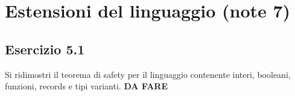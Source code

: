 \section{Estensioni del linguaggio (note 7)}
\subsection*{Esercizio 5.1}
Si ridimostri il teorema di safety per il linguaggio contenente interi, booleani, funzioni, records e tipi varianti. 
\textbf{{\color{red} DA FARE}}